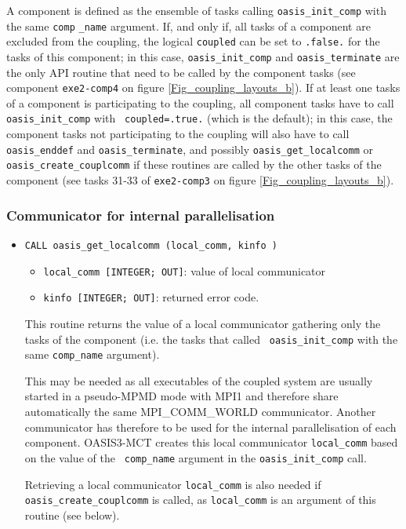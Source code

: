 \begin{itemize}
A component is defined as the ensemble of tasks  calling {\tt  oasis\_init\_comp} with the same {\tt comp} {\tt \_name}
argument. If, and only if, all tasks of a component are excluded from the coupling, the logical {\tt coupled} can be set to {\tt .false.}
for the tasks of this component; in this case, {\tt oasis\_init\_comp} and {\tt oasis\_terminate} are the
only API routine that need to be called by the component tasks (see component {\tt exe2-comp4} on figure \ref{Fig_coupling_layouts_b}). If at
least one tasks of a component is participating to the coupling, all
component tasks have to call {\tt oasis\_init\_comp} with {\tt
  coupled=.true.} (which is the default); in this case, the component tasks not
participating to the coupling will also have to call {\tt
  oasis\_enddef} and {\tt oasis\_terminate}, and possibly {\tt oasis\_get\_localcomm} or {\tt oasis\_create\_couplcomm} if these routines are called by the other tasks of the component (see tasks 31-33 of {\tt exe2-comp3} on figure \ref{Fig_coupling_layouts_b}).
\end{itemize}
\subsubsection{Communicator for internal parallelisation}
\label{subsec_MPI1}

\begin{itemize}
\item {\tt CALL oasis\_get\_localcomm (local\_comm, kinfo )}

  \begin{itemize}
  \item {\tt local\_comm [INTEGER; OUT]}: value of local communicator
  \item {\tt kinfo [INTEGER; OUT]}: returned error code.
  \end{itemize}

  This routine returns the value of a local communicator gathering
  only the tasks of the component (i.e. the tasks that called {\tt
  oasis\_init\_comp} with the same {\tt comp\_name}
argument).

  This may be needed as all executables of the coupled system are usually started in a pseudo-MPMD
  mode with MPI1 and therefore share automatically the same MPI\_COMM\_WORLD
  communicator.  Another communicator has therefore to be used for the internal
  parallelisation of each component. OASIS3-MCT creates this local
  communicator {\tt local\_comm} based on the value of the {\tt
    comp\_name} argument in the {\tt oasis\_init\_comp} call.

  Retrieving a local communicator {\tt local\_comm} is also needed if
  {\tt oasis\_create\_couplcomm} is called, as {\tt local\_comm} is an argument of this routine (see below).

\end{itemize}

